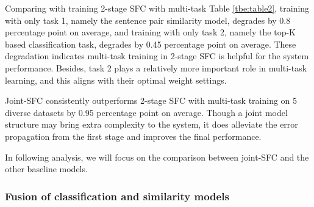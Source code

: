 Comparing with training 2-stage SFC with multi-task Table \ref{tbe:table2}, training with only task 1, namely the sentence pair similarity model, degrades by 0.8 percentage point on average, and training with only task 2, namely the top-K based classification task, degrades by 0.45 percentage point on average. 
These degradation indicates multi-task training in 2-stage SFC is helpful for the system performance. Besides, task 2 plays a relatively more important role in multi-task learning, and this aligns with their optimal weight settings.

Joint-SFC consistently outperforms 2-stage SFC with multi-task training on 5 diverse datasets by 0.95 percentage point on average. 
Though a joint model structure may bring extra complexity to the system, it does alleviate the error propagation from the first stage and improves the final performance.

In following analysis, we will focus on the comparison between joint-SFC and the other baseline models.

\subsubsection*{Fusion of classification and similarity models} 

\begin{table}
  \begin{centering}
  \end{centering}
  \caption{
    We show the performances of SFC from different settings of hyperparameters, $K$ denoting the candidate class number from stage 1,
    $P$ denoting the number of sampled sentence pair in stage 2. 
  }
  \label{tbe:table3}
\end{table}

